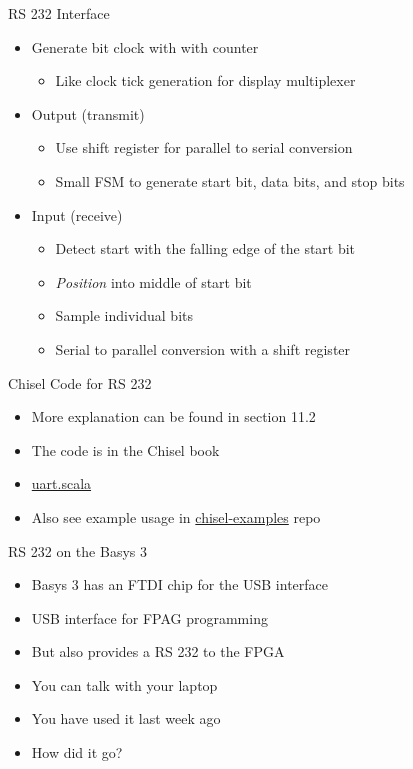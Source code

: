 \begin{frame}[fragile]{RS 232 Interface}
\begin{itemize}
\item Generate bit clock with with counter
\begin{itemize}
\item Like clock tick generation for display multiplexer
\end{itemize}
\item Output (transmit)
\begin{itemize}
\item Use shift register for parallel to serial conversion
\item Small FSM to generate start bit, data bits, and stop bits
\end{itemize}
\item Input (receive)
\begin{itemize}
\item Detect start with the falling edge of the start bit
\item \emph{Position} into middle of start bit
\item Sample individual bits
\item Serial to parallel conversion with a shift register
\end{itemize}
\end{itemize}
\end{frame}


\begin{frame}[fragile]{Chisel Code for RS 232}
\begin{itemize}
\item More explanation can be found in section 11.2
\item The code is in the Chisel book
\item \href{https://github.com/schoeberl/chisel-book/blob/master/src/main/scala/uart/uart.scala}{uart.scala}
\item Also see example usage in \href{https://github.com/schoeberl/chisel-examples}{chisel-examples} repo
\end{itemize}
\end{frame}

\begin{frame}[fragile]{RS 232 on the Basys 3}
\begin{itemize}
\item Basys 3 has an FTDI chip for the USB interface
\item USB interface for FPAG programming
\item But also provides a RS 232 to the FPGA
\item You can talk with your laptop
\item You have used it last week ago
\item How did it go?
\end{itemize}
\end{frame}



